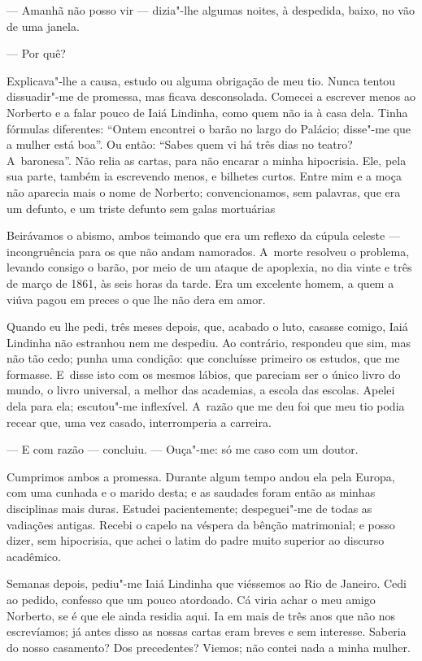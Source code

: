\begin{linenumbers}
--- Amanhã não posso vir --- dizia"-lhe algumas noites, à despedida, baixo,
no vão de uma janela.

--- Por quê?

Explicava"-lhe a causa, estudo ou alguma obrigação de meu tio. Nunca
tentou dissuadir"-me de promessa, mas ficava desconsolada. Comecei a
escrever menos ao Norberto e a falar pouco de Iaiá Lindinha, como quem
não ia à casa dela. Tinha fórmulas diferentes: ``Ontem encontrei o barão
no largo do Palácio; disse"-me que a mulher está boa''. Ou então: ``Sabes
quem vi há três dias no teatro? A~baronesa''. Não relia as cartas, para
não encarar a minha hipocrisia. Ele, pela sua parte, também ia
escrevendo menos, e bilhetes curtos. Entre mim e a moça não aparecia
mais o nome de Norberto; convencionamos, sem palavras, que era um
defunto, e um triste defunto sem galas mortuárias

Beirávamos o abismo, ambos teimando que era um reflexo da cúpula celeste
--- incongruência para os que não andam namorados. A~morte resolveu o
problema, levando consigo o barão, por meio de um ataque de apoplexia,
no dia vinte e três de março de 1861, às seis horas da tarde. Era um
excelente homem, a quem a viúva pagou em preces o que lhe não dera em
amor.

Quando eu lhe pedi, três meses depois, que, acabado o luto, casasse
comigo, Iaiá Lindinha não estranhou nem me despediu. Ao contrário,
respondeu que sim, mas não tão cedo; punha uma condição: que concluísse
primeiro os estudos, que me formasse. E~disse isto com os mesmos lábios,
que pareciam ser o único livro do mundo, o livro universal, a melhor das
academias, a escola das escolas. Apelei dela para ela; escutou"-me
inflexível. A~razão que me deu foi que meu tio podia recear que, uma vez
casado, interromperia a carreira.

--- E com razão --- concluiu. --- Ouça"-me: só me caso com um doutor.

Cumprimos ambos a promessa. Durante algum tempo andou ela pela Europa,
com uma cunhada e o marido desta; e as saudades foram então as minhas
disciplinas mais duras. Estudei pacientemente; despeguei"-me de todas as
vadiações antigas. Recebi o capelo na véspera da bênção matrimonial; e
posso dizer, sem hipocrisia, que achei o latim do padre muito superior
ao discurso acadêmico.

Semanas depois, pediu"-me Iaiá Lindinha que viéssemos ao Rio de Janeiro.
Cedi ao pedido, confesso que um pouco atordoado. Cá viria achar o meu
amigo Norberto, se é que ele ainda residia aqui. Ia em mais de três anos
que não nos escrevíamos; já antes disso as nossas cartas eram breves e
sem interesse. Saberia do nosso casamento? Dos precedentes? Viemos; não
contei nada a minha mulher.


\end{linenumbers}
